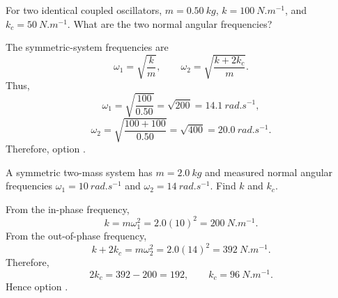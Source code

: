 \begin{quizquestion}[
  id=phy104-nm-026,
  topic=normal-modes,
  difficulty=applied,
  marks=2,
  correct=B,
  tags={coupled-oscillators,normal-frequency,eigenfrequencies},
  outcome={Calculate the normal frequencies of a symmetric coupled system}
]
  For two identical coupled oscillators, \(m=\SI{0.50}{kg}\), \(k=\SI{100}{N.m^{-1}}\), and \(k_c=\SI{50}{N.m^{-1}}\). What are the two normal angular frequencies?
\end{quizquestion}
\begin{quizsolution}
  The symmetric-system frequencies are
    \[
      \omega_1=\sqrt{\frac{k}{m}},\qquad
      \omega_2=\sqrt{\frac{k+2k_c}{m}}.
    \]
    Thus,
    \[
      \omega_1=\sqrt{\frac{100}{0.50}}=\sqrt{200}=\SI{14.1}{rad.s^{-1}},
    \]
    \[
      \omega_2=\sqrt{\frac{100+100}{0.50}}=\sqrt{400}=\SI{20.0}{rad.s^{-1}}.
    \]
    Therefore, option \textbf{\quizcorrectletter}.
\end{quizsolution}

\begin{quizquestion}[
  id=phy104-nm-027,
  topic=normal-modes,
  difficulty=applied,
  marks=2,
  correct=D,
  tags={coupled-oscillators,inverse-problem,spring-constants},
  outcome={Infer spring constants from measured normal frequencies}
]
  A symmetric two-mass system has \(m=\SI{2.0}{kg}\) and measured normal angular frequencies \(\omega_1=\SI{10}{rad.s^{-1}}\) and \(\omega_2=\SI{14}{rad.s^{-1}}\). Find \(k\) and \(k_c\).
\end{quizquestion}
\begin{quizsolution}
  From the in-phase frequency,
    \[
      k=m\omega_1^2=2.0{(10)}^2=\SI{200}{N.m^{-1}}.
    \]
    From the out-of-phase frequency,
    \[
      k+2k_c=m\omega_2^2=2.0{(14)}^2=\SI{392}{N.m^{-1}}.
    \]
    Therefore,
    \[
      2k_c=392-200=192,
      \qquad k_c=\SI{96}{N.m^{-1}}.
    \]
    Hence option \textbf{\quizcorrectletter}.
\end{quizsolution}

